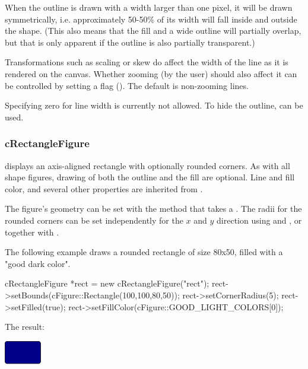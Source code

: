 When the outline is drawn with a width larger than one pixel, it will be
drawn symmetrically, i.e. approximately 50-50\% of its width will fall
inside and outside the shape. (This also means that the fill and a wide
outline will partially overlap, but that is only apparent if the
outline is also partially transparent.)

Transformations such as scaling or skew do affect the width of the line as it
is rendered on the canvas. Whether zooming (by the user) should also affect
it can be controlled by setting a flag ().
The default is non-zooming lines.

Specifying zero for line width is currently not allowed. To hide the outline,
 can be used.


\subsubsection{cRectangleFigure}

 displays an axis-aligned rectangle with
optionally rounded corners. As with all shape figures, drawing of both the
outline and the fill are optional. Line and fill color, and several other
properties are inherited from .

The figure's geometry can be set with the  method that
takes a . The radii for the rounded corners can
be set independently for the $x$ and $y$ direction using
 and , or together with
.

The following example draws a rounded rectangle of size 80x50, filled with
a "good dark color".

\begin{cpp}
cRectangleFigure *rect = new cRectangleFigure("rect");
rect->setBounds(cFigure::Rectangle(100,100,80,50));
rect->setCornerRadius(5);
rect->setFilled(true);
rect->setFillColor(cFigure::GOOD_LIGHT_COLORS[0]);
\end{cpp}


The result:

\begin{center}
\includegraphics[scale=4.0]{figures/figure-rectangle}
\end{center}


